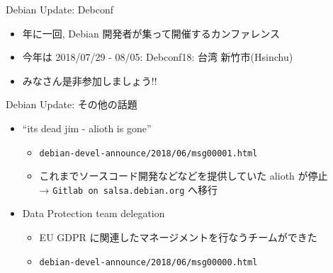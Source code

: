 \documentclass[cjk,c,squeeze,shrink,dvipdfmx,12pt]{beamer}
\begin{document}
\begin{frame}[fragile]{Debian Update: Debconf}%
  \begin{itemize}
  \item 年に一回, Debian 開発者が集って開催するカンファレンス
  \item 今年は
    \alert{2018/07/29 - 08/05: Debconf18: 台湾 新竹市(Hsinchu)}
  \end{itemize}
  \begin{center}
  \end{center}
  \begin{itemize}
  \item みなさん是非参加しましょう!!
  \end{itemize}
\end{frame}

\begin{frame}{Debian Update: その他の話題}
  \begin{itemize}
  \item ``its dead jim - alioth is gone''
    \begin{itemize}
    \item \texttt{debian-devel-announce/2018/06/msg00001.html}
    \item これまでソースコード開発などなどを提供していた alioth が停止 \\
      → \texttt{Gitlab on salsa.debian.org} へ移行
    \end{itemize}
  \item Data Protection team delegation
    \begin{itemize}
    \item EU GDPR に関連したマネージメントを行なうチームができた
    \item \texttt{debian-devel-announce/2018/06/msg00000.html}
    \end{itemize}
  \end{itemize}
\end{frame}
\end{document}
